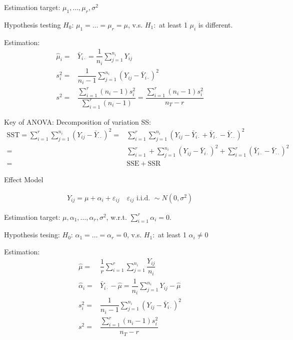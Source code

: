 Estimation target: $ \mu _1,\ldots,\mu _r,\sigma ^2 $

Hypothesis testing $ H_0 $: $ \mu _1=\ldots=\mu _r=\mu  $, v.s. $ H_1: $ at least 1 $ \mu _i $ is different.

Estimation:
\begin{align}
    \hat{\mu }_i=&\bar{Y}_{i\cdot}=\dfrac{1}{n_i}\sum_{j=1}^{n_i}Y_{ij}\\
    s_i^2=&\dfrac{1}{n_i-1}\sum_{j=1}^{n_i}(Y_{ij}-\bar{Y}_{i\cdot})^2\\
    s^2=&\dfrac{\sum_{i=1}^r(n_i-1)s_i^2}{\sum_{i=1}^r(n_i-1)}=\dfrac{\sum_{i=1}^r(n_i-1)s_i^2}{n_T-r}
\end{align}

Key of ANOVA: Decomposition of variation SS:
\begin{align}
    \mathrm{SST}=  \sum_{i=1}^r\sum_{j=1}^{n_i}(Y_{ij}-\bar{Y}_{\cdot\cdot})^2=&\sum_{i=1}^r\sum_{j=1}^{n_i}\left( Y_{ij}-\bar{Y}_{i\cdot}+\bar{Y}_{i\cdot}-\bar{Y}_{\cdot\cdot} \right)^2\\
    =&\sum_{i=1}^{r}+\sum_{j=1}^{n_i}(Y_{ij}-\bar{Y}_{i\cdot})^2+\sum_{i=1}^r(\bar{Y}_{i\cdot}-\bar{Y}_{\cdot\cdot})^2\\
    =&\mathrm{SSE}+\mathrm{SSR}  
\end{align}

\begin{point}
    Effect Model
\end{point}

    
    \begin{align}
        Y_{ij}=\mu+\alpha _i+\varepsilon _{ij}\quad \varepsilon _{ij}\text{ i.i.d. }\sim N(0,\sigma ^2) 
    \end{align}    

    Estimation target: $ \mu ,\alpha _1,\ldots,\alpha _r,\sigma ^2 $, w.r.t. $\sum_{i=1}^r\alpha _i=0$.

    Hypothesis tesing: $ H_0:\,\alpha _1=\ldots=\alpha _r=0 $, v.s. $ H_1: $ at least 1 $ \alpha _i\neq 0 $

    Estimation:
    \begin{align}
        \hat{\mu }=&\dfrac{1}{r}\sum_{i=1}^r\sum_{j=1}^{n_i}\dfrac{ Y_{ij} }{ n_i } \\
        \hat{\alpha }_i=&\bar{Y}_{i\cdot }-\hat{\mu }=\dfrac{ 1 }{ n_i }\sum_{j=1}^{n_i}Y_{ij}-\hat{\mu } \\
        s_i^2=&\dfrac{1}{n_i-1}\sum_{j=1}^{n_i}\left(Y_{ij}-\bar{Y}_{i\cdot}\right)^2\\
        s^2=&\dfrac{\sum_{i=1}^r(n_i-1)s_i^2}{n_T-r}
\end{align}    
    
